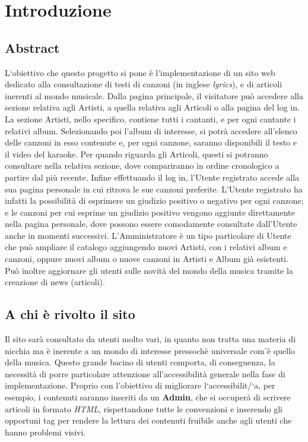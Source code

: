 \section{Introduzione}

\subsection{Abstract}
L`obiettivo che questo progetto si pone \`e l'implementazione di un sito web dedicato alla consultazione di testi di canzoni (in inglese \textit{lyrics}), e di articoli inerenti al mondo musicale. 
Dalla pagina principale, il visitatore pu\`o accedere alla sezione relativa agli Artisti, a quella relativa agli Articoli o alla pagina del log in.
La sezione Artisti, nello specifico, contiene tutti i cantanti, e per ogni cantante i relativi album. Selezionando poi l'album di interesse, si potr\`a accedere all'elenco delle canzoni in esso contenute e, per ogni canzone, saranno disponibili il testo e il video del karaoke.
Per quando riguarda gli Articoli, questi si potranno consultare nella relativa sezione, dove compariranno in ordine cronologico a partire dal pi\`u recente.
Infine effettuando il log in, l'Utente registrato accede alla sua pagina personale in cui ritrova le sue canzoni preferite. L'Utente registrato ha infatti la possibilit\`a di esprimere un giudizio positivo o negativo per ogni canzone; e le canzoni per cui esprime un giudizio positivo vengono aggiunte direttamente nella pagina personale, dove possono essere comodamente consultate dall'Utente anche in momenti successivi.
L'Amministratore è un tipo particolare di Utente che pu\`o ampliare il catalogo aggiungendo nuovi Artisti, con i relativi album e canzoni, oppure nuovi album o nuove canzoni in Artisti e Album gi\`a esistenti. Può inoltre aggiornare gli utenti sulle novità del mondo della musica tramite la creazione di news (articoli).


\subsection{A chi è rivolto il sito}
Il sito sar\`a consultato da utenti molto vari, in quanto non tratta una materia di nicchia ma \`e inerente a un mondo di interesse pressoch\`e universale com'\`e quello della musica. Questo grande bacino di utenti comporta, di conseguenza, la necessit\`a di porre particolare attenzione all'accessibilit\`a generale nella fase di implementazione. Proprio con l'obiettivo di migliorare l`accessibilit/`a, per esempio, i contenuti saranno inseriti da un \textbf{Admin}, che si occuperà di scrivere articoli in formato \textit{HTML}, rispettandone tutte le convenzioni e inserendo gli opportuni tag per rendere la lettura dei contenuti fruibile anche agli utenti che hanno problemi visivi.












